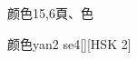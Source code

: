 \begin{entry}{颜色}{15,6}{⾴、⾊}
  \begin{phonetics}{颜色}{yan2 se4}[][HSK 2]
  \end{phonetics}
\end{entry}
